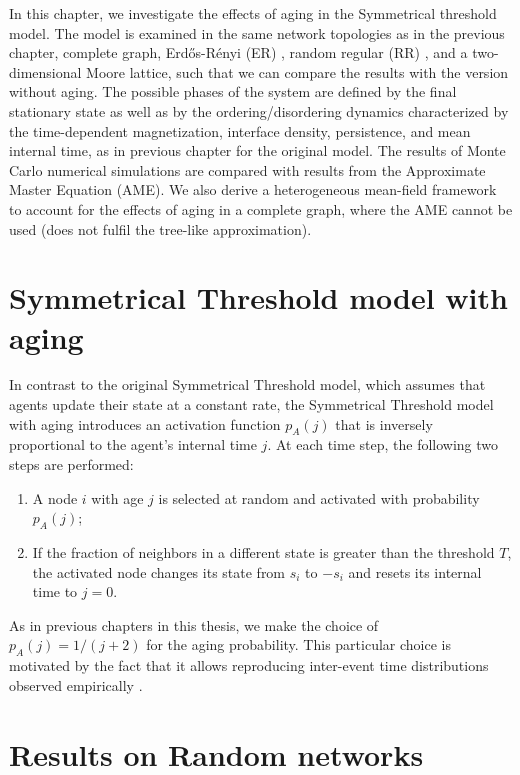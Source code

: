 In this chapter, we investigate the effects of aging in the Symmetrical threshold model. The model is examined in the same network topologies as in the previous chapter, complete graph, Erd\H{o}s-Rényi (ER)  \cite{erdos1960evolution}, random regular (RR) \cite{wormald_1999}, and a two-dimensional Moore lattice, such that we can compare the results with the version without aging. The possible phases of the system are defined by the final stationary state as well as by the ordering/disordering dynamics characterized by the time-dependent magnetization, interface density, persistence, and mean internal time, as in previous chapter for the original model. The results of Monte Carlo numerical simulations are compared with results from the Approximate Master Equation (AME). We also derive a heterogeneous mean-field framework to account for the effects of aging in a complete graph, where the AME cannot be used (does not fulfil the tree-like approximation).
	
\section{\label{Symmetrical Threshold model with aging} Symmetrical Threshold model with aging}
	
In contrast to the original Symmetrical Threshold model, which assumes that agents update their state at a constant rate, the Symmetrical Threshold model with aging introduces an activation function $p_A (j)$ that is inversely proportional to the agent's internal time $j$. At each time step, the following two steps are performed:

\begin{enumerate}
    \item A node $i$ with age $j$ is selected at random and activated with probability $p_A(j)$;
    \item If the fraction of neighbors in a different state is greater than the threshold $T$, the activated node changes its state from $s_i$ to $-s_i$ and resets its internal time to $j=0$.
\end{enumerate}

As in previous chapters in this thesis, we make the choice of $p_A(j) = 1/(j+2)$ for the aging probability. This particular choice is motivated by the fact that it allows reproducing inter-event time distributions observed empirically \cite{rybski-2009,artime-2017}. 

\section{\label{sec:Dynamics on networks} Results on Random networks}

